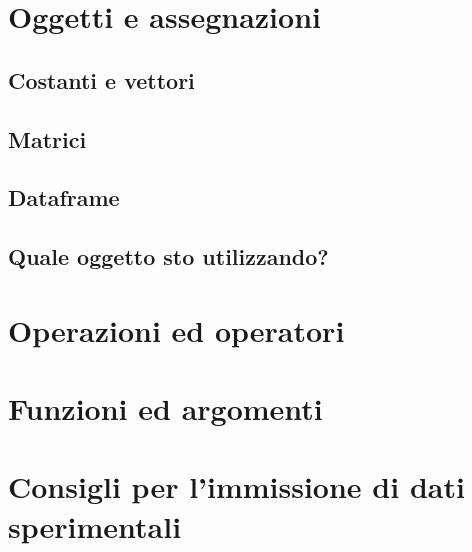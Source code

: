 \documentclass[a4paper,12pt,oneside]{book}
\begin{document}
\hypertarget{oggetti-e-assegnazioni}{%
\section*{Oggetti e assegnazioni}\label{oggetti-e-assegnazioni}}

\hypertarget{costanti-e-vettori}{%
\subsection*{Costanti e vettori}\label{costanti-e-vettori}}

\hypertarget{matrici}{%
\subsection*{Matrici}\label{matrici}}

\hypertarget{dataframe}{%
\subsection*{Dataframe}\label{dataframe}}

\hypertarget{quale-oggetto-sto-utilizzando}{%
\subsection*{Quale oggetto sto utilizzando?}\label{quale-oggetto-sto-utilizzando}}

\hypertarget{operazioni-ed-operatori}{%
\section*{Operazioni ed operatori}\label{operazioni-ed-operatori}}

\hypertarget{funzioni-ed-argomenti}{%
\section*{Funzioni ed argomenti}\label{funzioni-ed-argomenti}}

\hypertarget{consigli-per-limmissione-di-dati-sperimentali}{%
\section*{Consigli per l'immissione di dati sperimentali}\label{consigli-per-limmissione-di-dati-sperimentali}}
\end{document}
